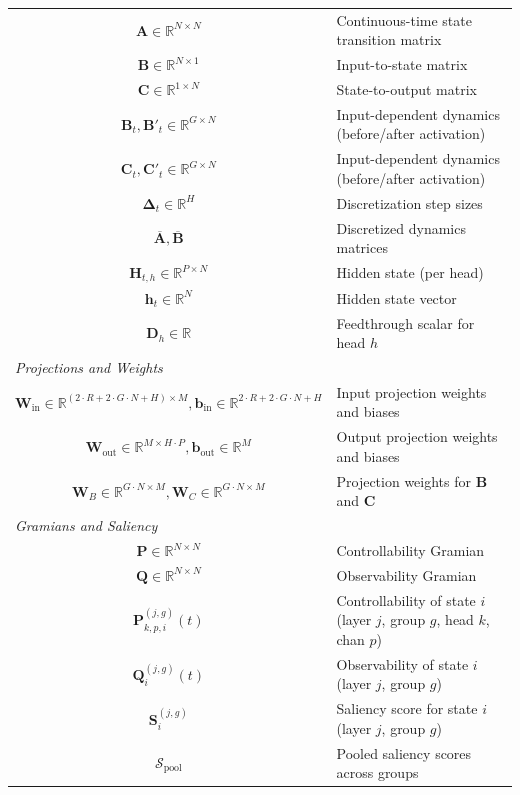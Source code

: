 \documentclass{article}
\theoremstyle{plain}
\theoremstyle{definition}
\theoremstyle{remark}
\begin{document}
\begin{table}[h]
\begin{tabular}{cl}
$\bm{A} \in \mathbb{R}^{N \times N}$ & Continuous-time state transition matrix \\
$\bm{B} \in \mathbb{R}^{N \times 1}$ & Input-to-state matrix \\
$\bm{C} \in \mathbb{R}^{1 \times N}$ & State-to-output matrix \\
$\bm{B}_t, \bm{B}'_t \in \mathbb{R}^{G \times N}$ & Input-dependent dynamics (before/after activation) \\
$\bm{C}_t, \bm{C}'_t \in \mathbb{R}^{G \times N}$ & Input-dependent dynamics (before/after activation) \\
$\bm{\Delta}_t \in \mathbb{R}^H$ & Discretization step sizes \\
$\overline{\bm{A}}, \overline{\bm{B}}$ & Discretized dynamics matrices \\
$\bm{H}_{t,h} \in \mathbb{R}^{P \times N}$ & Hidden state (per head) \\
$\bm{h}_t \in \mathbb{R}^N$ & Hidden state vector \\
$\bm{D}_h \in \mathbb{R}$ & Feedthrough scalar for head $h$ \\
\midrule
\multicolumn{2}{l}{\textit{Projections and Weights}} \\
$\bm{W}_{\text{in}} \in \mathbb{R}^{(2\cdot R + 2 \cdot G \cdot N + H) \times M}, \bm{b}_{\text{in}} \in \mathbb{R}^{2\cdot R + 2 \cdot G \cdot N + H}$ & Input projection weights and biases \\
$\bm{W}_{\text{out}} \in \mathbb{R}^{M \times H \cdot P}, \bm{b}_{\text{out}} \in \mathbb{R}^M$ & Output projection weights and biases \\
$\bm{W}_B \in \mathbb{R}^{G \cdot N \times M}, \bm{W}_C \in \mathbb{R}^{G \cdot N \times M}$ & Projection weights for $\bm{B}$ and $\bm{C}$ \\
\midrule
\multicolumn{2}{l}{\textit{Gramians and Saliency}} \\
$\bm{P} \in \mathbb{R}^{N \times N}$ & Controllability Gramian \\
$\bm{Q} \in \mathbb{R}^{N \times N}$ & Observability Gramian \\
$\bm{P}^{(j,g)}_{k,p,i}(t)$ & Controllability of state $i$ (layer $j$, group $g$, head $k$, chan $p$) \\
$\bm{Q}^{(j,g)}_i(t)$ & Observability of state $i$ (layer $j$, group $g$) \\
$\bm{S}^{(j,g)}_i$ & Saliency score for state $i$ (layer $j$, group $g$) \\
$\mathcal{S}_{\text{pool}}$ & Pooled saliency scores across groups \\

\end{tabular}
\end{table}
\end{document}
